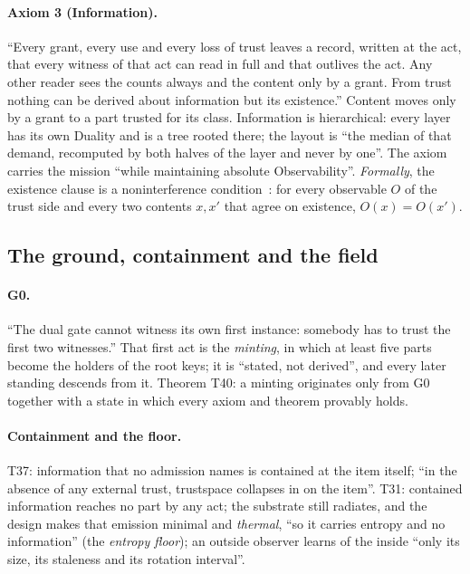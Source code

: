 \paragraph{Axiom 3 (Information).} ``Every grant, every use and every loss of trust leaves a record, written at the act, that every witness
of that act can read in full and that outlives the act. Any other reader sees the counts always and the content only by a grant. From trust
nothing can be derived about information but its existence.'' Content moves only by a grant to a part trusted for its class. Information
is hierarchical: every layer has its own Duality and is a tree rooted there; the layout is ``the median of that demand, recomputed by both
halves of the layer and never by one''. The axiom carries the mission ``while maintaining absolute Observability''. \emph{Formally}, the
existence clause is a noninterference condition~\cite{gm}: for every observable $O$ of the trust side and every two contents $x,x'$ that
agree on existence, $O(x)=O(x')$.

\subsection{The ground, containment and the field}

\paragraph{G0.} ``The dual gate cannot witness its own first instance: somebody has to trust the first two witnesses.'' That first act is
the \emph{minting}, in which at least five parts become the holders of the root keys; it is ``stated, not derived'', and every later
standing descends from it. Theorem T40: a minting originates only from G0 together with a state in which every axiom and theorem
provably holds.

\paragraph{Containment and the floor.} T37: information that no admission names is contained at the item itself; ``in the absence of any
external trust, trustspace collapses in on the item''. T31: contained information reaches no part by any act; the substrate still
radiates, and the design makes that emission minimal and \emph{thermal}, ``so it carries entropy and no information'' (the \emph{entropy
floor}); an outside observer learns of the inside ``only its size, its staleness and its rotation interval''.


